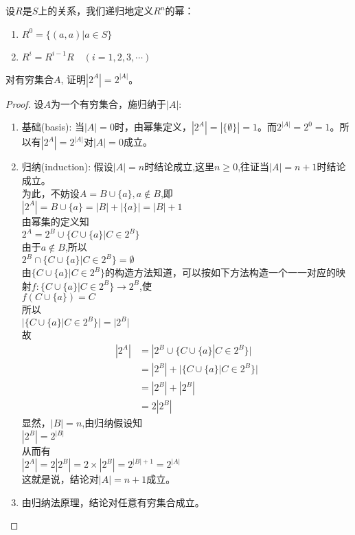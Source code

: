 \begin{definition}
	设$R$是$S$上的关系，我们递归地定义$R^n$的幂：
	\begin{enumerate}
		\item $R^0 = \{(a,a)|a\in S\}$
		\item $R^i = R^{i-1}R\quad (i=1,2,3,\cdots)$
	\end{enumerate}
\end{definition}

\begin{example}
对有穷集合$A$, 证明$|2^A| = 2^{|A|}$。
\begin{proof}
	设$A$为一个有穷集合，施归纳于$|A|$:
	\begin{enumerate}
		\item 基础(basis): 当$|A|=0$时，由幂集定义，$|2^A|=|\{\emptyset \}|=1$。而$2^{|A|}=2^0=1$。所以有$|2^A|=2^{|A|}$对$|A|=0$成立。
		\item 归纳(induction): 假设$|A|=n$时结论成立,这里$n\ge 0$,往证当$|A|=n+1$时结论成立。\\
		为此，不妨设$A=B\cup \{a\},a\notin B$,即\\
		$|2^A|=B\cup \{a\}=|B|+|\{a\}|=|B|+1$\\
		由幂集的定义知\\
		$2^A = 2^B \cup \{C\cup \{ a\} | C\in 2^B\}$\\
		由于$a\notin B$,所以\\
		$2^B\cap \{C\cup \{a\}|C\in 2^B \} = \emptyset$\\
		由$\{C\cup \{a\}|C\in 2^B \}$的构造方法知道，可以按如下方法构造一个一一对应的映射$f:\{C\cup \{a\}|C\in 2^B \}\to 2^B$,使\\
		$f(C\cup\{a\})=C$\\
		所以\\
		$|\{C\cup \{a\}|C\in 2^B \}|=|2^B|$\\
		故
		\begin{align*}
			|2^A|&=|2^B \cup \{C\cup \{ a\} | C\in 2^B\}|\\
			&=|2^B|+|\{C\cup \{a\}|C\in 2^B \}| \\
			&=|2^B|+|2^B| \\
			&=2|2^B| 
	    \end{align*}
		显然，$|B|=n$,由归纳假设知\\
		$|2^B|=2^{|B|}$\\
		从而有\\
		$|2^A|=2|2^B|=2\times|2^B|=2^{|B|+1}=2^{|A|}$\\
		这就是说，结论对$|A|=n+1$成立。
		\item 由归纳法原理，结论对任意有穷集合成立。
	\end{enumerate}
\end{proof}	
\end{example}

